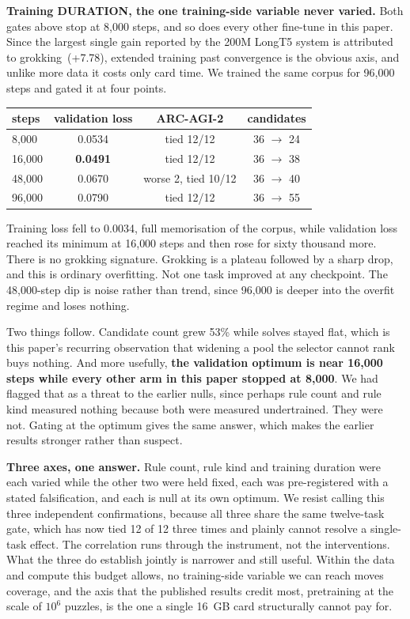 \documentclass[11pt]{article}
\begin{document}
\textbf{Training DURATION, the one training-side variable never varied.} Both gates above stop at
8{,}000 steps, and so does every other fine-tune in this paper. Since the largest single gain
reported by the 200M LongT5 system is attributed to grokking~(+7.78), extended training past
convergence is the obvious axis, and unlike more data it costs only card time. We trained the same
corpus for 96{,}000 steps and gated it at four points.

\begin{center}
\begin{tabular}{lccc}
\toprule
steps & validation loss & ARC-AGI-2 & candidates \\
\midrule
8{,}000 & 0.0534 & tied 12/12 & 36 $\to$ 24 \\
16{,}000 & \textbf{0.0491} & tied 12/12 & 36 $\to$ 38 \\
48{,}000 & 0.0670 & worse 2, tied 10/12 & 36 $\to$ 40 \\
96{,}000 & 0.0790 & tied 12/12 & 36 $\to$ 55 \\
\bottomrule
\end{tabular}
\end{center}

Training loss fell to 0.0034, full memorisation of the corpus, while validation loss reached its
minimum at 16{,}000 steps and then rose for sixty thousand more. There is no grokking signature.
Grokking is a plateau followed by a sharp drop, and this is ordinary overfitting. Not one task
improved at any checkpoint. The 48{,}000-step dip is noise rather than trend, since 96{,}000 is
deeper into the overfit regime and loses nothing.

Two things follow. Candidate count grew 53\% while solves stayed flat, which is this paper's recurring
observation that widening a pool the selector cannot rank buys nothing. And more usefully, \textbf{the
validation optimum is near 16{,}000 steps while every other arm in this paper stopped at 8{,}000}. We
had flagged that as a threat to the earlier nulls, since perhaps rule count and rule kind measured nothing
because both were measured undertrained. They were not. Gating at the optimum gives the same answer,
which makes the earlier results stronger rather than suspect.

\textbf{Three axes, one answer.} Rule count, rule kind and training duration were each varied while
the other two were held fixed, each was pre-registered with a stated falsification, and each is null
at its own optimum. We resist calling this three independent confirmations, because all three share
the same twelve-task gate, which has now tied 12 of 12 three times and plainly cannot resolve a
single-task effect. The correlation runs through the instrument, not the interventions. What the
three do establish jointly is narrower and still useful. Within the data and compute this budget
allows, no training-side variable we can reach moves coverage, and the axis that the published
results credit most, pretraining at the scale of $10^6$ puzzles, is the one a single 16~GB card
structurally cannot pay for.
\end{document}
